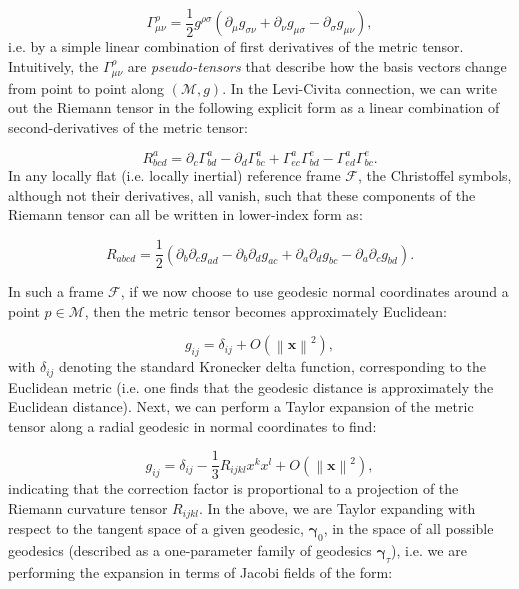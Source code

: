 \documentclass{article}
\begin{document}
\begin{equation}
\Gamma_{\mu \nu}^{\rho} = \frac{1}{2} g^{\rho \sigma} \left( \partial_{\mu} g_{\sigma \nu} + \partial_{\nu} g_{\mu \sigma} - \partial_{\sigma} g_{\mu \nu} \right),
\end{equation}
i.e. by a simple linear combination of first derivatives of the metric tensor. Intuitively, the ${\Gamma_{\mu \nu}^{\rho}}$ are \textit{pseudo-tensors} that describe how the basis vectors change from point to point along ${\left( \mathcal{M}, g \right)}$. In the Levi-Civita connection, we can write out the Riemann tensor in the following explicit form as a linear combination of second-derivatives of the metric tensor:

\begin{equation}
R_{b c d}^{a} = \partial_c \Gamma_{b d}^{a} - \partial_d \Gamma_{b c}^{a} + \Gamma_{e c}^{a} \Gamma_{b d}^{e} - \Gamma_{e d}^{a} \Gamma_{b c}^{e}.
\end{equation}
In any locally flat (i.e. locally inertial) reference frame ${\mathcal{F}}$, the Christoffel symbols, although not their derivatives, all vanish, such that these components of the Riemann tensor can all be written in lower-index form as:

\begin{equation}
R_{a b c d} = \frac{1}{2} \left( \partial_b \partial_c g_{a d} - \partial_b \partial_d g_{a c} + \partial_a \partial_d g_{b c} - \partial_a \partial_c g_{b d} \right).
\end{equation}

In such a frame ${\mathcal{F}}$, if we now choose to use geodesic normal coordinates around a point ${p \in \mathcal{M}}$, then the metric tensor becomes approximately Euclidean:

\begin{equation}
g_{i j} = \delta_{i j} + O \left( \left\lVert \mathbf{x} \right\rVert^2 \right),
\end{equation}
with ${\delta_{i j}}$ denoting the standard Kronecker delta function, corresponding to the Euclidean metric (i.e. one finds that the geodesic distance is approximately the Euclidean distance). Next, we can perform a Taylor expansion of the metric tensor along a radial geodesic in normal coordinates to find:

\begin{equation}
g_{i j} = \delta_{i j} - \frac{1}{3} R_{i j k l} x^k x^l + O \left( \left\lVert \mathbf{x} \right\rVert^2 \right),
\end{equation}
indicating that the correction factor is proportional to a projection of the Riemann curvature tensor ${R_{i j k l}}$. In the above, we are Taylor expanding with respect to the tangent space of a given geodesic, ${\boldsymbol\gamma_0}$, in the space of all possible geodesics (described as a one-parameter family of geodesics ${\boldsymbol\gamma_{\tau}}$), i.e. we are performing the expansion in terms of Jacobi fields of the form:
\end{document}
